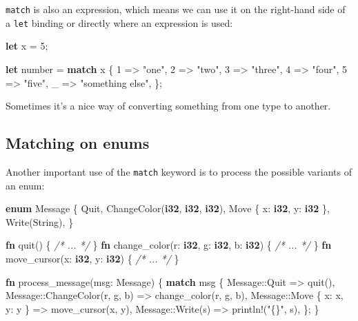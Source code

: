 \documentclass[a4paper,]{book}
\newenvironment{Shaded}{\begin{snugshade}}{\end{snugshade}}
\newcommand{\KeywordTok}[1]{\textcolor[rgb]{0.13,0.29,0.53}{\textbf{{#1}}}}
\newcommand{\DecValTok}[1]{\textcolor[rgb]{0.00,0.00,0.81}{{#1}}}
\newcommand{\StringTok}[1]{\textcolor[rgb]{0.31,0.60,0.02}{{#1}}}
\newcommand{\CommentTok}[1]{\textcolor[rgb]{0.56,0.35,0.01}{\textit{{#1}}}}
\newcommand{\OtherTok}[1]{\textcolor[rgb]{0.56,0.35,0.01}{{#1}}}
\newcommand{\NormalTok}[1]{{#1}}
\begin{document}
\texttt{match} is also an expression, which means we can use it on the
right-hand side of a \texttt{let} binding or directly where an
expression is used:

\begin{Shaded}
\begin{Highlighting}[]
\KeywordTok{let} \NormalTok{x = }\DecValTok{5}\NormalTok{;}

\KeywordTok{let} \NormalTok{number = }\KeywordTok{match} \NormalTok{x \{}
    \DecValTok{1} \NormalTok{=> }\StringTok{"one"}\NormalTok{,}
    \DecValTok{2} \NormalTok{=> }\StringTok{"two"}\NormalTok{,}
    \DecValTok{3} \NormalTok{=> }\StringTok{"three"}\NormalTok{,}
    \DecValTok{4} \NormalTok{=> }\StringTok{"four"}\NormalTok{,}
    \DecValTok{5} \NormalTok{=> }\StringTok{"five"}\NormalTok{,}
    \NormalTok{_ => }\StringTok{"something else"}\NormalTok{,}
\NormalTok{\};}
\end{Highlighting}
\end{Shaded}

Sometimes it's a nice way of converting something from one type to
another.

\subsection{Matching on enums}\label{matching-on-enums}

Another important use of the \texttt{match} keyword is to process the
possible variants of an enum:

\begin{Shaded}
\begin{Highlighting}[]
\KeywordTok{enum} \NormalTok{Message \{}
    \NormalTok{Quit,}
    \NormalTok{ChangeColor(}\KeywordTok{i32}\NormalTok{, }\KeywordTok{i32}\NormalTok{, }\KeywordTok{i32}\NormalTok{),}
    \NormalTok{Move \{ x: }\KeywordTok{i32}\NormalTok{, y: }\KeywordTok{i32} \NormalTok{\},}
    \NormalTok{Write(String),}
\NormalTok{\}}

\KeywordTok{fn} \NormalTok{quit() \{ }\CommentTok{/* ... */} \NormalTok{\}}
\KeywordTok{fn} \NormalTok{change_color(r: }\KeywordTok{i32}\NormalTok{, g: }\KeywordTok{i32}\NormalTok{, b: }\KeywordTok{i32}\NormalTok{) \{ }\CommentTok{/* ... */} \NormalTok{\}}
\KeywordTok{fn} \NormalTok{move_cursor(x: }\KeywordTok{i32}\NormalTok{, y: }\KeywordTok{i32}\NormalTok{) \{ }\CommentTok{/* ... */} \NormalTok{\}}

\KeywordTok{fn} \NormalTok{process_message(msg: Message) \{}
    \KeywordTok{match} \NormalTok{msg \{}
        \NormalTok{Message::Quit => quit(),}
        \NormalTok{Message::ChangeColor(r, g, b) => change_color(r, g, b),}
        \NormalTok{Message::Move \{ x: x, y: y \} => move_cursor(x, y),}
        \NormalTok{Message::Write(s) => }\OtherTok{println!}\NormalTok{(}\StringTok{"\{\}"}\NormalTok{, s),}
    \NormalTok{\};}
\NormalTok{\}}
\end{Highlighting}
\end{Shaded}
\end{document}
